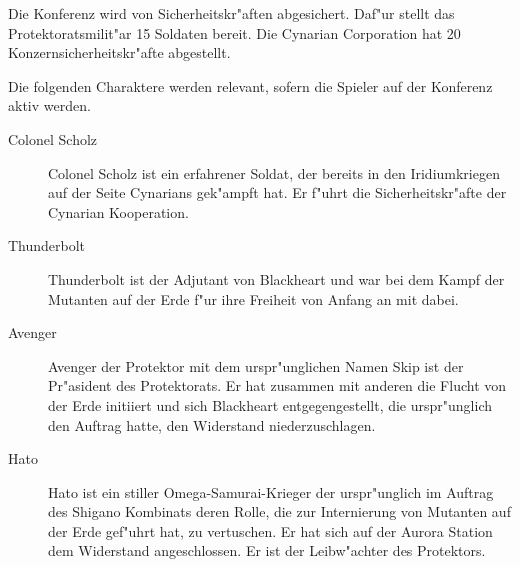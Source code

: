 
Die Konferenz wird von Sicherheitskr"aften abgesichert. Daf"ur stellt das Protektoratsmilit"ar 15 Soldaten bereit. Die 
Cynarian Corporation hat 20 Konzernsicherheitskr"afte abgestellt.

Die folgenden Charaktere werden relevant, sofern die Spieler auf der Konferenz aktiv werden.

\begin{description}
    \item[Colonel Scholz] Colonel Scholz ist ein erfahrener Soldat, der bereits in den Iridiumkriegen auf der Seite Cynarians gek"ampft hat. 
        Er f"uhrt die Sicherheitskr"afte der Cynarian Kooperation.
    \item[Thunderbolt] Thunderbolt ist der Adjutant von Blackheart und war bei dem Kampf der Mutanten auf der Erde f"ur ihre Freiheit von 
        Anfang an mit dabei.
    \item[Avenger] Avenger der Protektor mit dem urspr"unglichen Namen Skip ist der Pr"asident des Protektorats. Er hat zusammen mit anderen 
        die Flucht von der Erde initiiert und sich Blackheart entgegengestellt, die urspr"unglich den Auftrag hatte, den Widerstand niederzuschlagen.
    \item[Hato] Hato ist ein stiller Omega-Samurai-Krieger der urspr"unglich im Auftrag des Shigano Kombinats deren Rolle, die zur 
        Internierung von Mutanten auf der Erde gef"uhrt hat, zu vertuschen. Er hat sich auf der Aurora Station dem Widerstand angeschlossen. Er ist der Leibw"achter des Protektors.
\end{description}
\vfill\pagebreak

